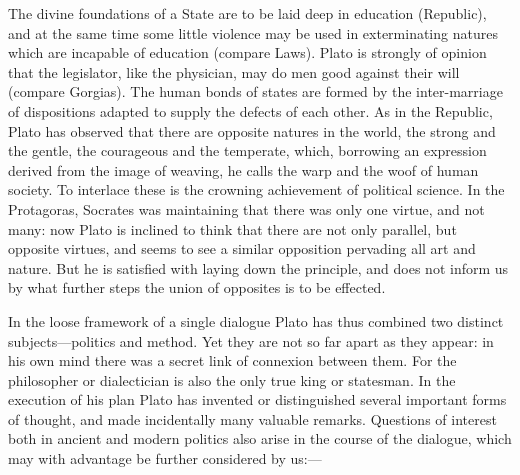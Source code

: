 \documentclass[11pt,letter]{article}
\begin{document}
\par  The divine foundations of a State are to be laid deep in education (Republic), and at the same time some little violence may be used in exterminating natures which are incapable of education (compare Laws). Plato is strongly of opinion that the legislator, like the physician, may do men good against their will (compare Gorgias). The human bonds of states are formed by the inter-marriage of dispositions adapted to supply the defects of each other. As in the Republic, Plato has observed that there are opposite natures in the world, the strong and the gentle, the courageous and the temperate, which, borrowing an expression derived from the image of weaving, he calls the warp and the woof of human society. To interlace these is the crowning achievement of political science. In the Protagoras, Socrates was maintaining that there was only one virtue, and not many: now Plato is inclined to think that there are not only parallel, but opposite virtues, and seems to see a similar opposition pervading all art and nature. But he is satisfied with laying down the principle, and does not inform us by what further steps the union of opposites is to be effected.

\par  In the loose framework of a single dialogue Plato has thus combined two distinct subjects—politics and method. Yet they are not so far apart as they appear: in his own mind there was a secret link of connexion between them. For the philosopher or dialectician is also the only true king or statesman. In the execution of his plan Plato has invented or distinguished several important forms of thought, and made incidentally many valuable remarks. Questions of interest both in ancient and modern politics also arise in the course of the dialogue, which may with advantage be further considered by us:—
\end{document}
